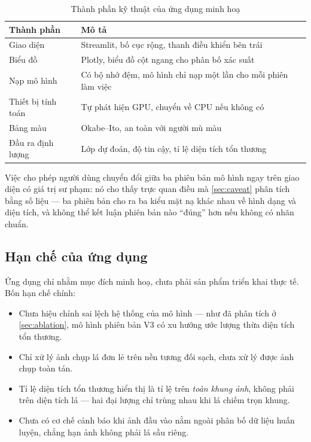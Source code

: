 \begin{table}[H]
\centering
\caption{Thành phần kỹ thuật của ứng dụng minh hoạ}
\label{tab:app_streamlit}
\begin{tabular}{L{4.6cm} L{8.4cm}}
\toprule
\textbf{Thành phần} & \textbf{Mô tả} \\
\midrule
Giao diện          & Streamlit, bố cục rộng, thanh điều khiển bên trái \\
Biểu đồ            & Plotly, biểu đồ cột ngang cho phân bố xác suất \\
Nạp mô hình        & Có bộ nhớ đệm, mô hình chỉ nạp một lần cho mỗi phiên làm việc \\
Thiết bị tính toán & Tự phát hiện GPU, chuyển về CPU nếu không có \\
Bảng màu           & Okabe--Ito, an toàn với người mù màu \\
Đầu ra định lượng  & Lớp dự đoán, độ tin cậy, tỉ lệ diện tích tổn thương \\
\bottomrule
\end{tabular}
\end{table}

Việc cho phép người dùng chuyển đổi giữa ba phiên bản mô hình ngay trên giao diện
có giá trị sư phạm: nó cho thấy trực quan điều mà \cref{sec:caveat} phân tích bằng
số liệu --- ba phiên bản cho ra ba kiểu mặt nạ khác nhau về hình dạng và diện tích,
và không thể kết luận phiên bản nào ``đúng'' hơn nếu không có nhãn chuẩn.

\subsection{Hạn chế của ứng dụng}

Ứng dụng chỉ nhằm mục đích minh hoạ, chưa phải sản phẩm triển khai thực tế. Bốn
hạn chế chính:

\begin{itemize}
    \item Chưa hiệu chỉnh sai lệch hệ thống của mô hình --- như đã phân tích ở
          \cref{sec:ablation}, mô hình phiên bản V3 có xu hướng ước lượng thừa
          diện tích tổn thương.
    \item Chỉ xử lý ảnh chụp lá đơn lẻ trên nền tương đối sạch, chưa xử lý được
          ảnh chụp toàn tán.
    \item Tỉ lệ diện tích tổn thương hiển thị là tỉ lệ trên \emph{toàn khung ảnh},
          không phải trên diện tích lá --- hai đại lượng chỉ trùng nhau khi lá
          chiếm trọn khung.
    \item Chưa có cơ chế cảnh báo khi ảnh đầu vào nằm ngoài phân bố dữ liệu huấn
          luyện, chẳng hạn ảnh không phải lá sầu riêng.
\end{itemize}
